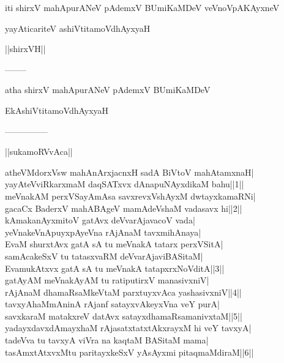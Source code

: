 \documentclass{article}
\begin{document}
\begin{center}
iti shirxV mahApurANeV pAdemxV BUmiKaMDeV veVnoVpAKAyxneV
\end{center}

\begin{center}
yayAticariteV ashiVtitamoVdhAyxyaH
\end{center}

\begin{center}
||shirxVH||
\end{center}

\begin{center}
--------
\end{center}

\begin{center}
atha shirxV mahApurANeV pAdemxV BUmiKaMDeV
\end{center}

\begin{center}
EkAshiVtitamoVdhAyxyaH
\end{center}

\begin{center}

---------------
\end{center}

\begin{center}
||sukamoRVvAca||
\end{center}

atheVMdorxVsw mahAnArxjacnxH sadA BiVtoV mahAtamxnaH|\\
yayAteVviRkarxmaM daqSATxvx dAnapuNAyxdikaM bahu||1||\\
meVnakAM perxVSayAmAsa savxrevxVshAyxM dwtayxkamaRNi|\\
gacaCx BaderxV mahABAgeV mamAdeVshaM vadasavx hi||2||\\
kAmakanAyxmitoV gatAvx deVvarAjavacoV vada|\\
yeVnakeVnApuyxpAyeVna rAjAnaM tavxmihAnaya|\\
EvaM shurxtAvx gatA sA tu meVnakA tatarx perxVSitA|\\
samAcakeSxV tu tatasxvaRM deVvarAjaviBASitaM|\\
EvamukAtxvx gatA sA tu meVnakA tatapxrxNoVditA||3||\\
gatAyAM meVnakAyAM tu ratiputirxV manasivxniV|\\
rAjAnaM dhamaRsaMkeVtaM parxtuyxvAca yashasivxniV||4||\\
tavxyAhaMmAninA rAjanf satayxvAkeyxVna veY purA|\\
savxkaraM matakxreV datAvx satayxdhamaRsamanivxtaM||5||\\
yadayxdavxdAmayxhaM rAjasatxtatxtAkxrayxM hi veY tavxyA|\\
tadeVva tu tavxyA viVra na kaqtaM BASitaM mama|\\
tasAmxtAtxvxMtu paritayxkeSxV yAsAyxmi pitaqmaMdiraM||6||\\
\end{document}
